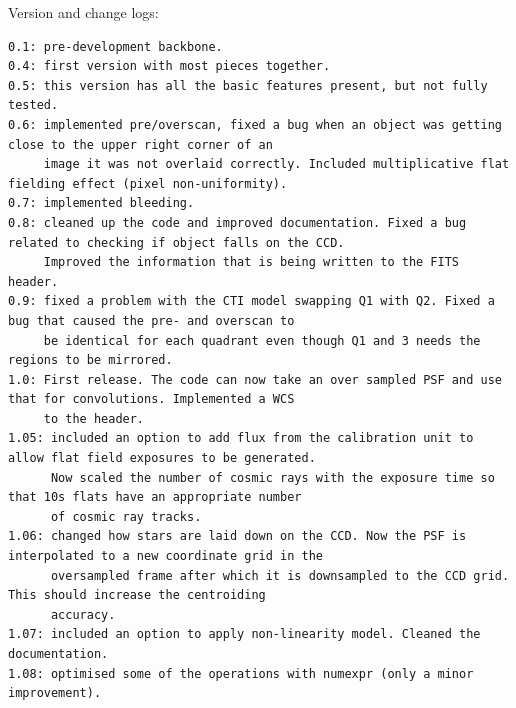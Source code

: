 \documentclass[a4paper,12pt,english]{sphinxmanual}
\begin{document}
Version and change logs:

\begin{Verbatim}[commandchars=\\\{\}]
0.1: pre-development backbone.
0.4: first version with most pieces together.
0.5: this version has all the basic features present, but not fully tested.
0.6: implemented pre/overscan, fixed a bug when an object was getting close to the upper right corner of an
     image it was not overlaid correctly. Included multiplicative flat fielding effect (pixel non-uniformity).
0.7: implemented bleeding.
0.8: cleaned up the code and improved documentation. Fixed a bug related to checking if object falls on the CCD.
     Improved the information that is being written to the FITS header.
0.9: fixed a problem with the CTI model swapping Q1 with Q2. Fixed a bug that caused the pre- and overscan to
     be identical for each quadrant even though Q1 and 3 needs the regions to be mirrored.
1.0: First release. The code can now take an over sampled PSF and use that for convolutions. Implemented a WCS
     to the header.
1.05: included an option to add flux from the calibration unit to allow flat field exposures to be generated.
      Now scaled the number of cosmic rays with the exposure time so that 10s flats have an appropriate number
      of cosmic ray tracks.
1.06: changed how stars are laid down on the CCD. Now the PSF is interpolated to a new coordinate grid in the
      oversampled frame after which it is downsampled to the CCD grid. This should increase the centroiding
      accuracy.
1.07: included an option to apply non-linearity model. Cleaned the documentation.
1.08: optimised some of the operations with numexpr (only a minor improvement).
\end{Verbatim}
\end{document}
